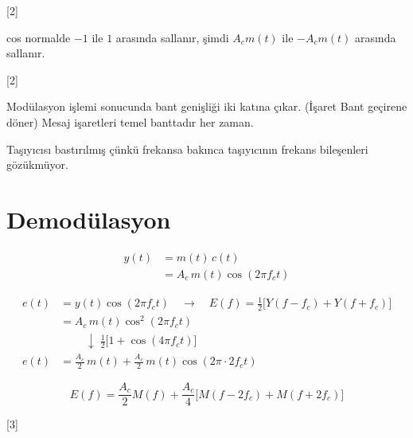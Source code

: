 \documentclass[11pt,a4paper]{article}
\begin{document}
[2]

cos normalde $-1$ ile $1$ arasında sallanır, şimdi $A_c m(t)$ ile $-A_c m(t)$ arasında sallanır.

[2]

Modülasyon işlemi sonucunda bant genişliği iki katına çıkar. (İşaret Bant geçirene döner) Mesaj işaretleri temel banttadır her zaman.

Taşıyıcısı bastırılmış çünkü frekansa bakınca taşıyıcının frekans bileşenleri gözükmüyor.

\section{Demodülasyon}

\begin{align*}
y(t) &= m(t)\,c(t)\\
     &= A_c\, m(t)\cos(2\pi f_c t)
\end{align*}

\begin{center}
\end{center}

\begin{align*}
e(t) &= y(t)\cos(2\pi f_c t) \quad\to\quad E(f)=\tfrac12\bigl[Y(f-f_c)+Y(f+f_c)\bigr]\\
     &= A_c\, m(t)\cos^2(2\pi f_c t)\\
     &\qquad\;\downarrow\; \tfrac12\bigl[1+\cos(4\pi f_c t)\bigr]\\
e(t) &= \tfrac{A_c}{2}\, m(t) + \tfrac{A_c}{2}\, m(t)\cos(2\pi\cdot 2f_c t)
\end{align*}

\[ E(f) = \frac{A_c}{2}M(f) + \frac{A_c}{4}\bigl[M(f-2f_c)+M(f+2f_c)\bigr] \]

[3]
\end{document}
